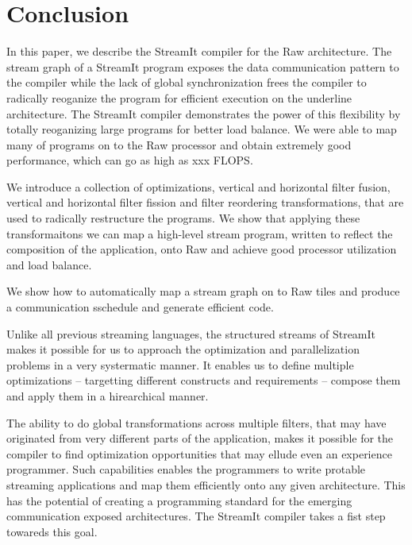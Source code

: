 \section{Conclusion}
\label{sec:conclusion}

In this paper, we describe the StreamIt compiler for the Raw
architecture.  The stream graph of a StreamIt program exposes the data
communication pattern to the compiler while the lack of global
synchronization frees the compiler to radically reoganize the program
for efficient execution on the underline architecture. The StreamIt
compiler demonstrates the power of this flexibility by totally
reoganizing large programs for better load balance. We were able to
map many of programs on to the Raw processor and obtain extremely good
performance, which can go as high as xxx FLOPS.

We introduce a collection of optimizations, vertical and horizontal
filter fusion, vertical and horizontal filter fission and filter
reordering transformations, that are used to radically restructure the
programs.  We show that applying these transformaitons we can map a
high-level stream program, written to reflect the composition of the
application, onto Raw and achieve good processor utilization and load
balance. 

We show how to automatically map a stream graph on to Raw tiles and
produce a communication sschedule and generate efficient code.

Unlike all previous streaming languages, the structured streams of
StreamIt makes it possible for us to approach the optimization and
parallelization problems in a very systermatic manner. It enables us
to define multiple optimizations -- targetting different constructs
and requirements -- compose them and apply them in a hirearchical
manner.

The ability to do global transformations across multiple filters, that
may have originated from very different parts of the application,
makes it possible for the compiler to find optimization opportunities
that may ellude even an experience programmer.  Such capabilities
enables the programmers to write protable streaming applications and
map them efficiently onto any given architecture. This has the
potential of creating a programming standard for the emerging
communication exposed architectures. The StreamIt compiler takes a
fist step towareds this goal.

